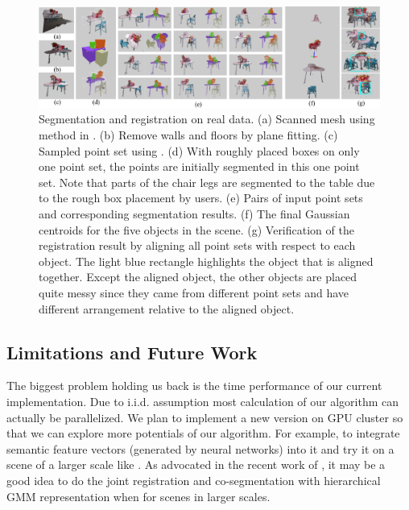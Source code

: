 \begin{figure}
	\centering
	\includegraphics[width=\linewidth]{images/realdata/realdata}
	\caption{\label{fig:realdata} Segmentation and registration on real data. (a) Scanned mesh using method in \cite{VXH}. (b) Remove walls and floors by plane fitting. (c) Sampled point set using \cite{PossionSampling}. (d) With roughly placed boxes on only one point set, the points are initially segmented in this one point set. Note that parts of the chair legs are segmented to the table due to the rough box placement by users. (e) Pairs of input point sets and corresponding segmentation results. (f) The final Gaussian centroids for the five objects in the scene. (g) Verification of the registration result by aligning all point sets with respect to each object. The light blue rectangle highlights the object that is aligned together. Except the aligned object, the other objects are placed quite messy since they came from different point sets and have different arrangement relative to the aligned object.   }
\end{figure} 
\subsection{Limitations and Future Work}
The biggest problem holding us back is the time performance of our current implementation.  Due to i.i.d. assumption most calculation of our algorithm can actually be parallelized. We plan to implement a new version on GPU cluster so that we can explore more potentials of our algorithm. 
For example, to integrate semantic feature vectors (generated by neural networks) into it and try it on a scene of a larger scale like \cite{GOGMA}. 
As advocated in the recent work of \cite{AGM}, it may be a good idea to do the joint registration and co-segmentation with hierarchical GMM representation when for scenes in larger scales. 
